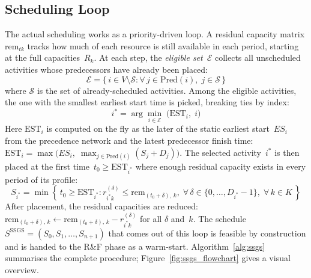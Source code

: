 \subsection{Scheduling Loop}
\label{subsec:ssgs_loop}
The actual scheduling works as a priority-driven loop. A residual
capacity matrix $\mathrm{rem}_{tk}$ tracks how much of each
resource is still available in each period, starting at the full
capacities~$R_k$.
At each step, the \textit{eligible set}~$\mathcal{E}$ collects all
unscheduled activities whose predecessors have already been placed:
\begin{equation}
    \mathcal{E} = \bigl\{\, i \in V \setminus \mathcal{S} :
    \forall\, j \in \mathrm{Pred}(i),\;
    j \in \mathcal{S} \,\bigr\}
    \label{eq:eligible}
\end{equation}
where $\mathcal{S}$ is the set of already-scheduled activities.
Among the eligible activities, the one with the smallest earliest
start time is picked, breaking ties by index:
\begin{equation}
    i^* = \arg\min_{i \in \mathcal{E}}\;
    \bigl(\mathrm{EST}_i,\; i\bigr)
    \label{eq:priority}
\end{equation}
Here $\mathrm{EST}_i$ is computed on the fly as the later of the
static earliest start~$ES_i$ from the precedence network and the
latest predecessor finish time:
$\mathrm{EST}_i = \max\!\bigl(ES_i,\;
\max_{j \in \mathrm{Pred}(i)} (S_j + D_j)\bigr)$.
The selected activity~$i^*$ is then placed at the first
time~$t_0 \geq \mathrm{EST}_{i^*}$ where enough residual capacity
exists in every period of its profile:
\begin{equation}
    S_{i^*} = \min\left\{\, t_0 \geq \mathrm{EST}_{i^*} :
    r_{i^* k}^{(\delta)} \leq \mathrm{rem}_{(t_0 + \delta),\, k},\;
    \forall\, \delta \in \{0, \ldots, D_{i^*}\!-\!1\},\;
    \forall\, k \in K \,\right\}
    \label{eq:ssgs_placement}
\end{equation}
After placement, the residual capacities are reduced:
$\mathrm{rem}_{(t_0 + \delta),\, k} \leftarrow
\mathrm{rem}_{(t_0 + \delta),\, k} - r_{i^* k}^{(\delta)}$ for
all $\delta$ and~$k$. The schedule
$S^{\mathrm{SSGS}} = (S_0, S_1, \ldots, S_{n+1})$ that comes out
of this loop is feasible by construction and is handed to the R\&F
phase as a warm-start. Algorithm~\ref{alg:ssgs} summarises the
complete procedure; Figure~\ref{fig:ssgs_flowchart} gives a visual
overview.

